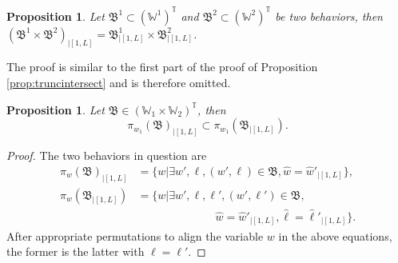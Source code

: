 \documentclass[11pt,print,draftcls,onecolumn,romanappendices]{ieeecolor}
\newtheorem{prop}[thm]{Proposition}
\newcommand{\W}{\mathbb{W}}
\newcommand{\T}{\mathbb{T}}
\newcommand{\proj}[2]{\pi_{#1}\left(#2\right)}
\newcommand{\revise}[1]{{\color{black} #1}}
\newcommand{\B}{\mathfrak{B}}
\newcommand{\bint}[1]{{|[#1]}}
\begin{document}
\begin{prop}\label{prop:trunccartesian}
	Let $\B^1\subset\left(\W^1\right)^\T$ and $\B^2\subset\left(\W^2\right)^\T$ be two behaviors, then
	$ \left(\B^1\times\B^2\right)_\bint{1,L}=\B^1_\bint{1,L}\times\B^2_\bint{1,L}$.
	\end{prop}

The proof is similar to the first part of the proof of Proposition \ref{prop:truncintersect} and is therefore omitted.
\begin{prop}\label{prop:truncproj}
	Let $\B\in(\W_1\times\W_2)^\T$, then
	\begin{equation}
	    \proj{w_1}{\B}_\bint{1,L}\subset\proj{w_1}{\B_\bint{1,L}}.
	\end{equation}
\end{prop}
\begin{proof}
	The two behaviors in question are
	\begin{align*}
		\proj{w}{\mathfrak{B}}_{|[1,L]}&=\bigl\{w|\exists w',\ell, (w',\ell)\in\mathfrak{B},\hat{w}=\hat{w}'_\bint{1,L}\bigr\},\\
		\proj{w}{\mathfrak{B}_{|[1,L]}}&=\bigl\{w|\exists w',\ell,\ell',(w',\ell')\in\mathfrak{B},\\
		&\qquad\qquad\qquad\quad\hat{w}=\hat{w}'_\bint{1,L},\hat{\ell}=\hat{\ell}'_\bint{1,L}\bigr\}.
	\end{align*}
	\revise{After appropriate permutations to align the variable $w$ in the above equations,} the former is the latter with $\ell=\ell'$.
\end{proof}
\end{document}
